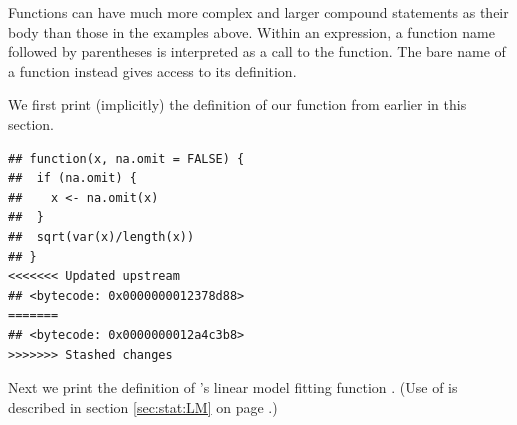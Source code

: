 \documentclass[krantz2]{krantz}\usepackage{knitr}
\begin{document}
Functions can have much more complex and larger compound statements as their body than those in the examples above. Within an expression, a function name followed by parentheses is interpreted as a call to the function. The bare name of a function instead gives access to its definition.

We first print (implicitly) the definition of our function from earlier in this section.

\begin{knitrout}\footnotesize
{}\color{fgcolor}\begin{kframe}
\begin{alltt}
\end{alltt}
\begin{verbatim}
## function(x, na.omit = FALSE) {
##  if (na.omit) {
##    x <- na.omit(x)
##  }
##  sqrt(var(x)/length(x))
## }
<<<<<<< Updated upstream
## <bytecode: 0x0000000012378d88>
=======
## <bytecode: 0x0000000012a4c3b8>
>>>>>>> Stashed changes
\end{verbatim}
\end{kframe}
\end{knitrout}

Next we print the definition of \Rlang's linear model fitting function . (Use of  is described in section \ref{sec:stat:LM} on page \pageref{sec:stat:LM}.)
\end{document}
